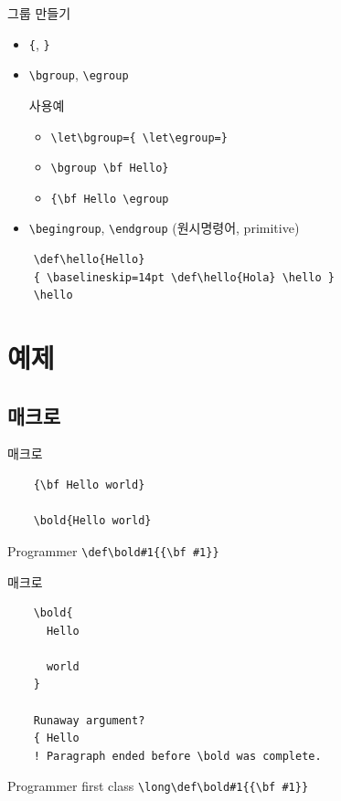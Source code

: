 \documentclass{beamer}
\begin{document}
%
\begin{frame}[fragile]{그룹 만들기}
  \begin{itemize}
  \item \verb+{+, \verb+}+
  \item \verb+\bgroup+, \verb+\egroup+
    \begin{alertblock}{사용예}
      \begin{itemize}
      \item \verb+\let\bgroup={ \let\egroup=}+
      \item \verb+\bgroup \bf Hello}+
      \item \verb+{\bf Hello \egroup+
      \end{itemize}
    \end{alertblock}
  \item \verb+\begingroup+, \verb+\endgroup+ (원시명령어, primitive)
  \end{itemize}

  {\small
  \begin{verbatim}
    \def\hello{Hello}
    { \baselineskip=14pt \def\hello{Hola} \hello }
    \hello
  \end{verbatim}}
\end{frame}



\section{예제}


\subsection{\texttt{\string\bold} 매크로}
%
\begin{frame}[fragile]{\texttt{\string\bold} 매크로}
  \begin{verbatim}
    {\bf Hello world}
    
    \bold{Hello world}
  \end{verbatim}
  \begin{alertblock}{Programmer}
    \verb+\def\bold#1{{\bf #1}}+
  \end{alertblock}
\end{frame}


%
\begin{frame}[fragile]{\texttt{\string\bold} 매크로}
  \begin{verbatim}
    \bold{
      Hello

      world
    }

    Runaway argument?
    { Hello
    ! Paragraph ended before \bold was complete.
  \end{verbatim}
  \begin{alertblock}{Programmer first class}
    \verb+\long\def\bold#1{{\bf #1}}+
  \end{alertblock}
\end{frame}
\end{document}
